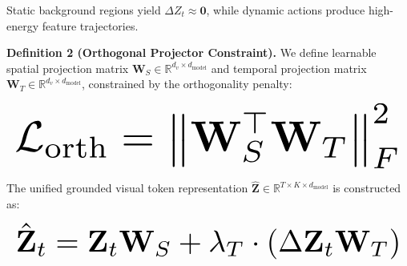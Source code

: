 \documentclass[10pt,journal,compsoc,twocolumn]{IEEEtran}
\begin{document}
Static background regions yield $\Delta Z_t \approx \mathbf{0}$, while dynamic actions produce high-energy feature trajectories.

\textbf{Definition 2 (Orthogonal Projector Constraint).} We define learnable spatial projection matrix $\mathbf{W}_S \in \mathbb{R}^{d_v \times d_{\text{model}}}$ and temporal projection matrix $\mathbf{W}_T \in \mathbb{R}^{d_v \times d_{\text{model}}}$, constrained by the orthogonality penalty:

















\begin{equation}
\resizebox{\columnwidth}{!}{$\displaystyle
\begin{aligned}
\mathcal{L}_{\text{orth}} = \left\| \mathbf{W}_S^\top \mathbf{W}_T \right\|_F^2
\end{aligned}
$}
\end{equation}

















The unified grounded visual token representation $\hat{\mathbf{Z}} \in \mathbb{R}^{T \times K \times d_{\text{model}}}$ is constructed as:

















\begin{equation}
\resizebox{\columnwidth}{!}{$\displaystyle
\begin{aligned}
\hat{\mathbf{Z}}_t = \mathbf{Z}_t \mathbf{W}_S + \lambda_T \cdot \left( \Delta \mathbf{Z}_t \mathbf{W}_T \right)
\end{aligned}
$}
\end{equation}
\end{document}
